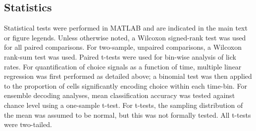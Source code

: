 \subsection*{Statistics}
Statistical tests were performed in MATLAB and are indicated in the main text or figure legends. Unless otherwise noted, a Wilcoxon signed-rank test was used for all paired comparisons. For two-sample, unpaired comparisons, a Wilcoxon rank-sum test was used. Paired t-tests were used for bin-wise analysis of lick rates. For quantification of choice signals as a function of time, multiple linear regression was first performed as detailed above; a binomial test was then applied to the proportion of cells significantly encoding choice within each time-bin. For ensemble decoding analyses, mean classification accuracy was tested against chance level using a one-sample t-test. For t-tests, the sampling distribution of the mean was assumed to be normal, but this was not formally tested. All t-tests were two-tailed.